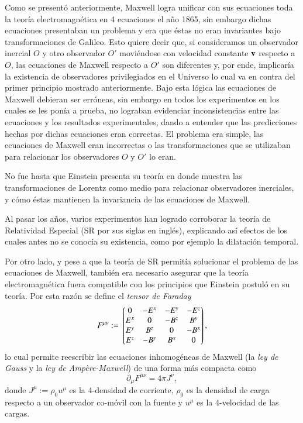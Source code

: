 Como se presentó anteriormente, Maxwell logra unificar con sus ecuaciones toda la teoría electromagnética en 4  ecuaciones el año 1865, sin embargo dichas ecuaciones presentaban un problema y era que éstas no eran invariantes bajo transformaciones de Galileo. Esto quiere decir que, si consideramos un observador inercial $O$ y otro observador $O'$ moviéndose con velocidad constante $\vb{v}$ respecto a $O$, las ecuaciones de Maxwell respecto a $O'$ son diferentes y, por ende, implicaría la existencia de observadores privilegiados en el Universo lo cual va en contra del primer principio mostrado anteriormente. Bajo esta lógica las ecuaciones de Maxwell debieran ser erróneas, sin embargo en todos los experimentos en los cuales se les ponía a prueba, no lograban evidenciar inconsistencias entre las ecuaciones y los resultados experimentales, dando a entender que las predicciones hechas por dichas ecuaciones eran correctas. El problema era simple, las ecuaciones de Maxwell eran incorrectas o las transformaciones que se utilizaban para relacionar los observadores $O$ y $O'$ lo eran.

No fue hasta que Einstein presenta su teoría en donde muestra las transformaciones de Lorentz como medio para relacionar observadores inerciales, y cómo éstas mantienen la invariancia de las ecuaciones de Maxwell.

Al pasar los años, varios experimentos han logrado corroborar la teoría de Relatividad Especial (SR por sus siglas en inglés), explicando así efectos de los cuales antes no se conocía su existencia, como por ejemplo la dilatación temporal.

Por otro lado, y pese a que la teoría de SR permitía solucionar el problema de las ecuaciones de Maxwell, también era necesario asegurar que la teoría electromagnética fuera compatible con los principios que Einstein postuló en su teoría. Por esta razón se define el \textit{tensor de Faraday}
\begin{equation}
F^{\mu \nu} := \mqty*(
0 & -E^x & -E^y & -E^z \\
E^x & 0 & -B^z & B^y \\
E^y & B^z & 0 & -B^x \\
E^z & -B^y & B^x & 0 \\ 
),
\end{equation}
lo cual permite reescribir las ecuaciones inhomogéneas de Maxwell (la \textit{ley de Gauss} y la \textit{ley de Ampère-Maxwell}) de una forma más compacta como
\begin{equation}
\label{eq:1}
\partial_{\mu} F^{\mu \nu} = 4\pi J^{\nu},
\end{equation}
donde $J^{\mu} := \rho_0 u^{\mu}$ es la 4-densidad de corriente, $\rho_0$ es la densidad de carga respecto a un observador co-móvil con la fuente y $u^{\mu}$ es la 4-velocidad de las cargas.

